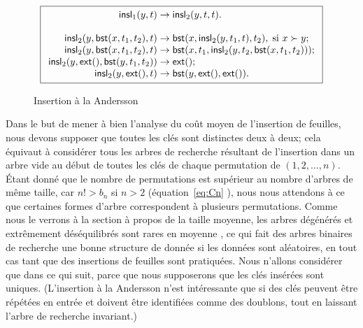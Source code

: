 \begin{figure}[b]
\begin{equation*}
\boxed{
\begin{array}{r@{\;}l@{\;}l}
\fun{insl}_1(y,t) & \rightarrow & \fun{insl}_2(y,t,t).\\
\\
\fun{insl}_2(y,\fun{bst}(x,t_1,t_2),t) & \rightarrow &
  \fun{bst}(x,\fun{insl}_2(y,t_1,t),t_2), \; \text{si \(x \succ y\)};\\
\fun{insl}_2(y,\fun{bst}(x,t_1,t_2),t) & \rightarrow &
  \fun{bst}(x,t_1,\fun{insl}_2(y,t_2,\fun{bst}(x,t_1,t_2)));\\
\fun{insl}_2(y,\fun{ext}(),\fun{bst}(y,t_1,t_2)) & \rightarrow & \fun{ext}();\\
\fun{insl}_2(y,\fun{ext}(),t) & \rightarrow & \fun{bst}(y,\fun{ext}(),\fun{ext}()).
\end{array}}
\end{equation*}
\caption{Insertion à la Andersson}
\label{fig:insl1}
\end{figure}


Dans le but de mener à bien l'analyse du coût moyen de l'insertion de
feuilles, nous devons supposer que toutes les clés sont distinctes
deux à deux; cela équivaut à considérer tous les arbres de recherche
résultant de l'insertion dans un arbre vide au début de toutes les
clés de chaque permutation de \((1,2,\dots,n)\). Étant donné que le
nombre de permutations est supérieur au nombre d'arbres de même
taille, car \(n! > b_n\) si \(n > 2\) (équation~\eqref{eq:Cn}
), nous nous attendons à ce que certaines formes
d'arbre correspondent à plusieurs permutations. Comme nous le verrons
à la section à propos de la taille moyenne, les arbres dégénérés et
extrêmement déséquilibrés sont rares en moyenne \citep{Fill_1996}, ce
qui fait des arbres binaires de recherche une bonne structure de
donnée si les données sont aléatoires, en tout cas tant que des
insertions de feuilles sont pratiquées. Nous n'allons considérer que
 dans ce qui suit, parce que nous supposerons que les clés
insérées sont uniques. (L'insertion à la Andersson n'est intéressante
que si des clés peuvent être répétées en entrée et doivent être
identifiées comme des doublons, tout en laissant l'arbre de recherche
invariant.)

\bigskip

